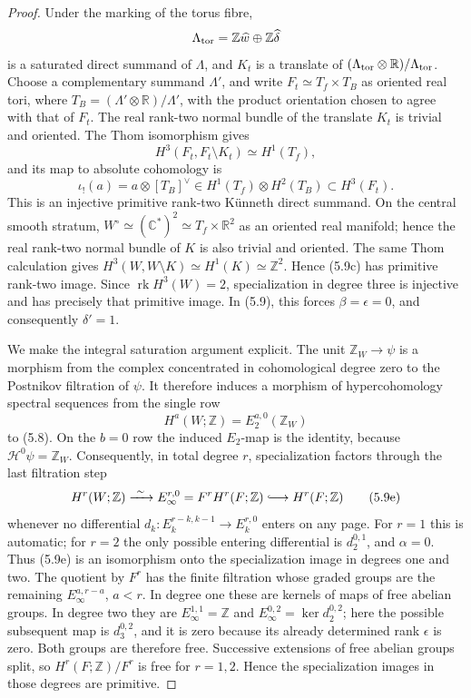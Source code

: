 \begin{proof}
Under the marking of the torus fibre,
\[
 \Lambda_{\rm tor}=\mathbb Z\widehat w\oplus
                    \mathbb Z\widehat\delta
\]
is a saturated direct summand of \(\Lambda\), and \(K_t\) is a translate of
\((\Lambda_{\rm tor}\otimes\mathbb R)/\Lambda_{\rm tor}\).  Choose a
complementary summand \(\Lambda'\), and write
\(F_t\simeq T_f\times T_B\) as oriented real tori, where
\(T_B=(\Lambda'\otimes\mathbb R)/\Lambda'\), with the product orientation
chosen to agree with that of \(F_t\).  The real rank-two normal bundle of
the translate \(K_t\) is trivial and oriented.  The Thom isomorphism gives
\[
H^3(F_t,F_t\setminus K_t)\simeq H^1(T_f),
\]
and its map to absolute cohomology is
\[
 \iota_!(a)=a\otimes[T_B]^\vee
 \in H^1(T_f)\otimes H^2(T_B)\subset H^3(F_t).
\tag{5.9d}
\]
This is an injective primitive rank-two K\"unneth direct summand.  On the
central smooth stratum,
\(W^\circ\simeq(\mathbb C^*)^2\simeq T_f\times\mathbb R^2\) as an
oriented real manifold; hence the real rank-two normal bundle of \(K\) is
also trivial and oriented.  The same Thom calculation gives
\(H^3(W,W\setminus K)\simeq H^1(K)\simeq\mathbb Z^2\).
Hence (5.9c) has primitive rank-two image.  Since
\(\operatorname{rk}H^3(W)=2\), specialization in degree three is injective
and has precisely that primitive image.  In (5.9), this forces
\(\beta=\epsilon=0\), and consequently \(\delta'=1\).

We make the integral saturation argument explicit.  The unit
\(\mathbb Z_W\to\psi\) is a morphism from the complex concentrated in
cohomological degree zero to the Postnikov filtration of \(\psi\).  It
therefore induces a morphism of hypercohomology spectral sequences from the
single row
\[
 H^a(W;\mathbb Z)=E_2^{a,0}(\mathbb Z_W)
\]
to (5.8).  On the \(b=0\) row the induced \(E_2\)-map is the identity,
because \(\mathcal H^0\psi=\mathbb Z_W\).  Consequently, in total degree
\(r\), specialization factors through the last filtration step
\[
 H^r(W;\mathbb Z)\xrightarrow{\ \sim\ }
 E_\infty^{r,0}=F^rH^r(F;\mathbb Z)
 \lhook\joinrel\longrightarrow H^r(F;\mathbb Z)
 \tag{5.9e}
\]
whenever no differential
\(d_k:E_k^{r-k,k-1}\to E_k^{r,0}\) enters on any page.  For \(r=1\) this
is automatic; for \(r=2\) the only possible entering differential is
\(d_2^{0,1}\), and \(\alpha=0\).  Thus (5.9e) is an isomorphism onto the
specialization image in degrees one and two.  The quotient by \(F^r\) has
the finite filtration whose graded groups are the remaining
\(E_\infty^{a,r-a}\), \(a<r\).  In degree one these are kernels of maps of
free abelian groups.  In degree two they are
\(E_\infty^{1,1}=\mathbb Z\) and
\(E_\infty^{0,2}=\ker d_2^{0,2}\); here the possible subsequent map is
\(d_3^{0,2}\), and it is zero because its already determined rank
\(\epsilon\) is zero.  Both groups are therefore free.  Successive extensions of
free abelian groups split, so \(H^r(F;\mathbb Z)/F^r\) is free for
\(r=1,2\).  Hence the specialization images in those degrees are
primitive.


\end{proof}
